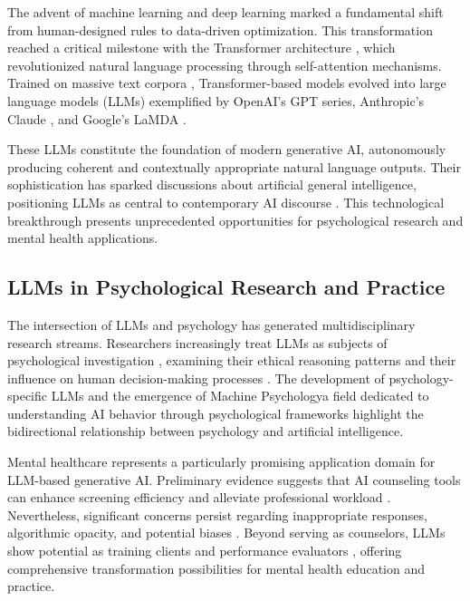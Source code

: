 \documentclass{wiley-article}
\begin{document}
The advent of machine learning and deep learning marked a fundamental shift from human-designed rules to data-driven optimization. This transformation reached a critical milestone with the Transformer architecture \citep{vaswaniAttentionAllYou2023}, which revolutionized natural language processing through self-attention mechanisms. Trained on massive text corpora \citep{gaoPile800GBDataset2020}, Transformer-based models evolved into large language models (LLMs) exemplified by OpenAI's GPT series, Anthropic's Claude \citep{enisLLMNMTAdvancing2024}, and Google's LaMDA \citep{thoppilanLaMDALanguageModels2022}.

These LLMs constitute the foundation of modern generative AI, autonomously producing coherent and contextually appropriate natural language outputs. Their sophistication has sparked discussions about artificial general intelligence, positioning LLMs as central to contemporary AI discourse \citep{ferrarisArchitectureLanguageUnderstanding2025,xiRisePotentialLarge2023}. This technological breakthrough presents unprecedented opportunities for psychological research and mental health applications.

\subsection*{LLMs in Psychological Research and Practice}

The intersection of LLMs and psychology has generated multidisciplinary research streams. Researchers increasingly treat LLMs as subjects of psychological investigation \citep{abdurahmanPerilsOpportunitiesUsing2024}, examining their ethical reasoning patterns \citep{almeidaExploringPsychologyLLMs2024} and their influence on human decision-making processes \citep{eignerDeterminantsLLMassistedDecisionMaking2024}. The development of psychology-specific LLMs \citep{huPsycoLLMEnhancingLLM2025} and the emergence of Machine Psychology\textemdash{}a field dedicated to understanding AI behavior through psychological frameworks \citep{hagendorff2023machine}\textemdash{}highlight the bidirectional relationship between psychology and artificial intelligence.

Mental healthcare represents a particularly promising application domain for LLM-based generative AI. Preliminary evidence suggests that AI counseling tools can enhance screening efficiency and alleviate professional workload \citep{stadeLargeLanguageModels2024}. Nevertheless, significant concerns persist regarding inappropriate responses, algorithmic opacity, and potential biases \citep{demszkyUsingLargeLanguage2023}. Beyond serving as counselors, LLMs show potential as training clients \citep{mauryaUsingAIBased2024} and performance evaluators \citep{qiuInteractiveAgentsSimulating2024}, offering comprehensive transformation possibilities for mental health education and practice.
\end{document}
